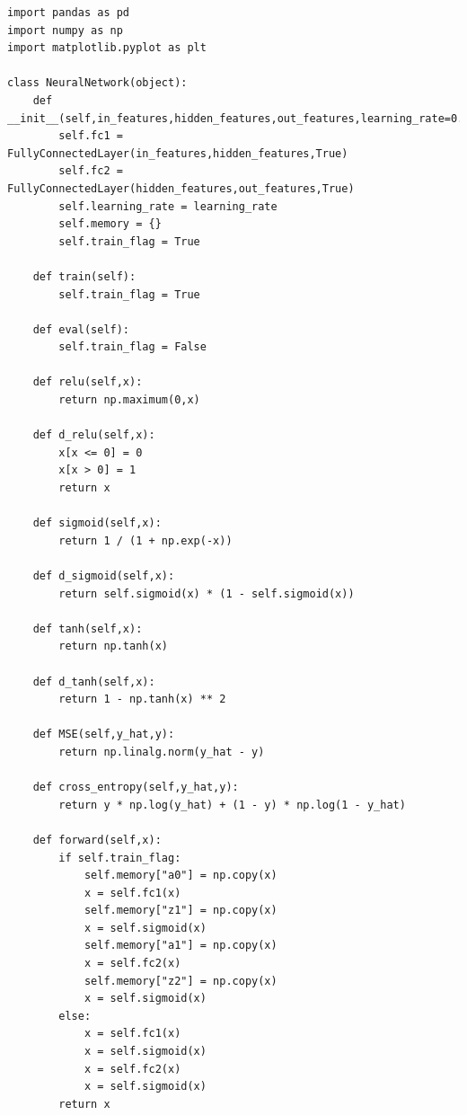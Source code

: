\documentclass[a4paper, 11pt]{article}
\begin{document}
\begin{enumerate}
\begin{lstlisting}
import pandas as pd
import numpy as np
import matplotlib.pyplot as plt

class NeuralNetwork(object):
    def __init__(self,in_features,hidden_features,out_features,learning_rate=0.1):
        self.fc1 = FullyConnectedLayer(in_features,hidden_features,True)
        self.fc2 = FullyConnectedLayer(hidden_features,out_features,True)
        self.learning_rate = learning_rate
        self.memory = {}
        self.train_flag = True

    def train(self):
        self.train_flag = True
        
    def eval(self):
        self.train_flag = False
        
    def relu(self,x):
        return np.maximum(0,x)

    def d_relu(self,x):
        x[x <= 0] = 0
        x[x > 0] = 1
        return x

    def sigmoid(self,x):
        return 1 / (1 + np.exp(-x))

    def d_sigmoid(self,x):
        return self.sigmoid(x) * (1 - self.sigmoid(x))

    def tanh(self,x):
        return np.tanh(x)

    def d_tanh(self,x):
        return 1 - np.tanh(x) ** 2

    def MSE(self,y_hat,y):
        return np.linalg.norm(y_hat - y)

    def cross_entropy(self,y_hat,y):
        return y * np.log(y_hat) + (1 - y) * np.log(1 - y_hat)

    def forward(self,x):
        if self.train_flag:
            self.memory["a0"] = np.copy(x)
            x = self.fc1(x)
            self.memory["z1"] = np.copy(x)
            x = self.sigmoid(x)
            self.memory["a1"] = np.copy(x)
            x = self.fc2(x)
            self.memory["z2"] = np.copy(x)
            x = self.sigmoid(x)
        else:
            x = self.fc1(x)
            x = self.sigmoid(x)
            x = self.fc2(x)
            x = self.sigmoid(x)
        return x


\end{lstlisting}
\end{enumerate}
\end{document}
